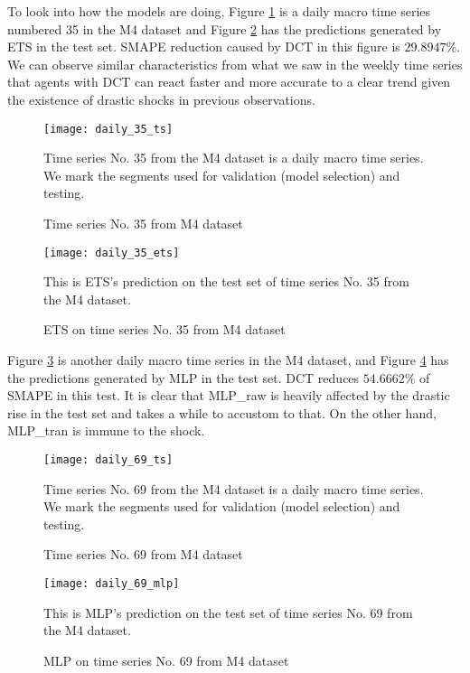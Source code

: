 To look into how the models are doing, Figure \ref{fig: daily 35 ts} is a daily macro time series numbered 35 in the M4 dataset and Figure \ref{fig: daily 35 ets} has the predictions generated by ETS in the test set. SMAPE reduction caused by DCT in this figure is $29.8947\%$. We can observe similar characteristics from what we saw in the weekly time series that agents with DCT can react faster and more accurate to a clear trend given the existence of drastic shocks in previous observations.
\begin{figure}[H]
    \centering
    \texttt{[image: daily\_35\_ts]}
    \caption{Time series No. 35 from M4 dataset}
    {\raggedright \footnotesize Time series No. 35 from the M4 dataset is a daily macro time series. We mark the segments used for validation (model selection) and testing.\par}
    \label{fig: daily 35 ts}
\end{figure}
\begin{figure}[H]
    \centering
    \texttt{[image: daily\_35\_ets]}
    \caption{ETS on time series No. 35 from M4 dataset}
    {\raggedright \footnotesize This is ETS's prediction on the test set of time series No. 35 from the M4 dataset.  \par}
    \label{fig: daily 35 ets}
\end{figure}
Figure \ref{fig: daily 69 ts} is another daily macro time series in the M4 dataset, and Figure \ref{fig: daily 69 mlp} has the predictions generated by MLP in the test set. DCT reduces $54.6662\%$ of SMAPE in this test. It is clear that MLP\_raw is heavily affected by the drastic rise in the test set and takes a while to accustom to that. On the other hand, MLP\_tran is immune to the shock.
\begin{figure}[H]
    \centering
    \texttt{[image: daily\_69\_ts]}
    \caption{Time series No. 69 from M4 dataset}
    {\raggedright \footnotesize Time series No. 69 from the M4 dataset is a daily macro time series. We mark the segments used for validation (model selection) and testing.\par}
    \label{fig: daily 69 ts}
\end{figure}
\begin{figure}[H]
    \centering
    \texttt{[image: daily\_69\_mlp]}
    \caption{MLP on time series No. 69 from M4 dataset}
    {\raggedright \footnotesize This is MLP's prediction on the test set of time series No. 69 from the M4 dataset.  \par}
    \label{fig: daily 69 mlp}
\end{figure}

